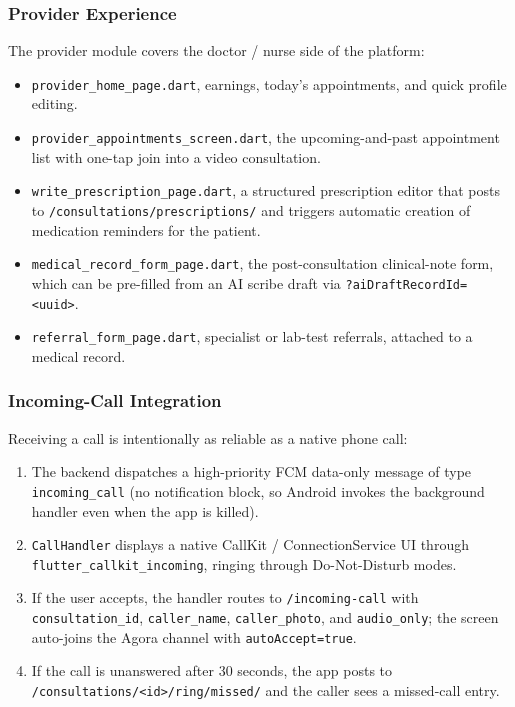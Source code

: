 \subsubsection*{Provider Experience}

The provider module covers the doctor / nurse side of the platform:

\begin{itemize}
  \item \texttt{provider\_home\_page.dart}, earnings, today's appointments, and quick profile editing.
  \item \texttt{provider\_appointments\_screen.dart}, the upcoming-and-past appointment list with one-tap join into a video consultation.
  \item \texttt{write\_prescription\_page.dart}, a structured prescription editor that posts to \texttt{/consultations/prescriptions/} and triggers automatic creation of medication reminders for the patient.
  \item \texttt{medical\_record\_form\_page.dart}, the post-consultation clinical-note form, which can be pre-filled from an AI scribe draft via \texttt{?aiDraftRecordId=<uuid>}.
  \item \texttt{referral\_form\_page.dart}, specialist or lab-test referrals, attached to a medical record.
\end{itemize}

\subsubsection*{Incoming-Call Integration}

Receiving a call is intentionally as reliable as a native phone call:

\begin{enumerate}
  \item The backend dispatches a high-priority FCM data-only message of type \texttt{incoming\_call} (no notification block, so Android invokes the background handler even when the app is killed).
  \item \texttt{CallHandler} displays a native CallKit / ConnectionService UI through \texttt{flutter\_callkit\_incoming}, ringing through Do-Not-Disturb modes.
  \item If the user accepts, the handler routes to \texttt{/incoming-call} with \texttt{consultation\_id}, \texttt{caller\_name}, \texttt{caller\_photo}, and \texttt{audio\_only}; the screen auto-joins the Agora channel with \texttt{autoAccept=true}.
  \item If the call is unanswered after 30 seconds, the app posts to \texttt{/consultations/<id>/ring/missed/} and the caller sees a missed-call entry.
\end{enumerate}

